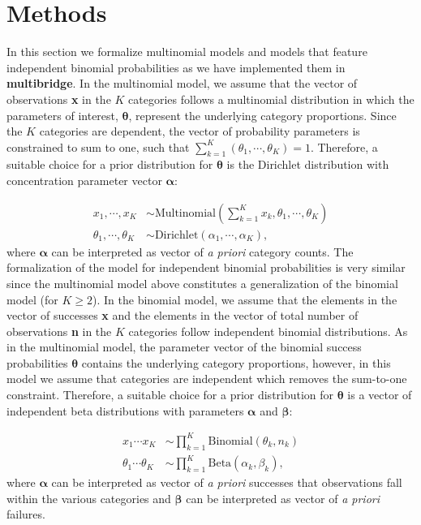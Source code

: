 \documentclass[
  english,
  man,floatsintext]{apa6}
\begin{document}
\hypertarget{methods}{%
\section{Methods}\label{methods}}

\noindent In this section we formalize multinomial models and models that feature independent binomial probabilities as we have implemented them in \textbf{multibridge}. In the multinomial model, we assume that the vector of observations \textbf{x} in the \(K\) categories follows a multinomial distribution in which the parameters of interest, \(\boldsymbol{\theta}\), represent the underlying category proportions. Since the \(K\) categories are dependent, the vector of probability parameters is constrained to sum to one, such that \(\sum_{k = 1}^K (\theta_1, \cdots, \theta_K) = 1\). Therefore, a suitable choice for a prior distribution for \(\boldsymbol{\theta}\) is the Dirichlet distribution with concentration parameter vector \(\boldsymbol{\alpha}\):

\begin{align}
  x_1, \cdots, x_K &\sim \text{Multinomial}(\sum_{k = 1}^K x_k, \theta_1, \cdots, \theta_K) \\
  \theta_1, \cdots, \theta_K &\sim \text{Dirichlet}(\alpha_1, \cdots, \alpha_K),
\end{align}
where \(\boldsymbol{\alpha}\) can be interpreted as vector of \emph{a priori} category counts. The formalization of the model for independent binomial probabilities is very similar since the multinomial model above constitutes a generalization of the binomial model (for \(K \geq 2\)). In the binomial model, we assume that the elements in the vector of successes \textbf{x} and the elements in the vector of total number of observations \textbf{n} in the \(K\) categories follow independent binomial distributions. As in the multinomial model, the parameter vector of the binomial success probabilities \(\boldsymbol{\theta}\) contains the underlying category proportions, however, in this model we assume that categories are independent which removes the sum-to-one constraint. Therefore, a suitable choice for a prior distribution for \(\boldsymbol{\theta}\) is a vector of independent beta distributions with parameters \(\boldsymbol{\alpha}\) and \(\boldsymbol{\beta}\):

\begin{align}
  x_1 \cdots x_K & \sim \prod_{k = 1}^K \text{Binomial}(\theta_k, n_k) \\
  \theta_1 \cdots \theta_K &\sim \prod_{k = 1}^K \text{Beta}(\alpha_k, \beta_k),
\end{align}
where \(\boldsymbol{\alpha}\) can be interpreted as vector of \emph{a priori} successes that observations fall within the various categories and \(\boldsymbol{\beta}\) can be interpreted as vector of \emph{a priori} failures.
\end{document}
